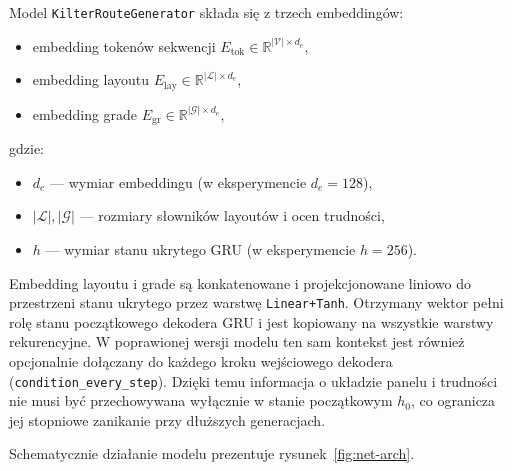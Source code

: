 \documentclass[12pt,a4paper]{article}
\begin{document}
Model \texttt{KilterRouteGenerator} składa się z trzech embeddingów:
\begin{itemize}[leftmargin=1.5em]
    \item embedding tokenów sekwencji $E_{\text{tok}} \in \mathbb{R}^{|\mathcal{V}|\times d_e}$,
    \item embedding layoutu $E_{\text{lay}} \in \mathbb{R}^{|\mathcal{L}|\times d_e}$,
    \item embedding grade $E_{\text{gr}} \in \mathbb{R}^{|\mathcal{G}|\times d_e}$,
\end{itemize}
gdzie:
\begin{itemize}[leftmargin=1.5em]
    \item $d_e$ --- wymiar embeddingu (w eksperymencie $d_e = 128$),
    \item $|\mathcal{L}|, |\mathcal{G}|$ --- rozmiary słowników layoutów i ocen trudności,
    \item $h$ --- wymiar stanu ukrytego GRU (w eksperymencie $h = 256$).
\end{itemize}
Embedding layoutu i grade są konkatenowane i projekcjonowane liniowo do przestrzeni stanu ukrytego przez warstwę \texttt{Linear+Tanh}. Otrzymany wektor pełni rolę stanu początkowego dekodera GRU i jest kopiowany na wszystkie warstwy rekurencyjne. W poprawionej wersji modelu ten sam kontekst jest również opcjonalnie dołączany do każdego kroku wejściowego dekodera (\texttt{condition\_every\_step}). Dzięki temu informacja o układzie panelu i trudności nie musi być przechowywana wyłącznie w stanie początkowym $h_0$, co ogranicza jej stopniowe zanikanie przy dłuższych generacjach.

Schematycznie działanie modelu prezentuje rysunek~\ref{fig:net-arch}.
\end{document}
